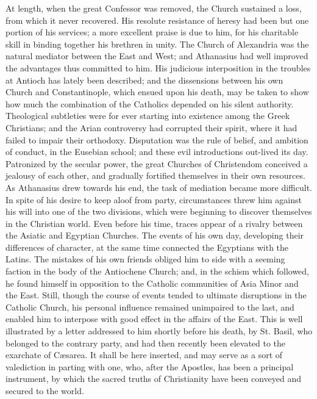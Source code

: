 At length, when the great Confessor was removed, the Church
sustained a loss, from which it never recovered. His resolute
resistance of heresy had been but one portion of his services; a more
excellent praise is due to him, for his charitable skill in binding
together his brethren in unity. The Church of Alexandria was the
natural mediator between the East and West; and Athanasius had well
improved the advantages thus committed to him. His judicious
interposition in the troubles at Antioch has lately been described;
and the dissensions between his own Church and Constantinople, which
ensued upon his death, may be taken to show how much the combination
of the Catholics depended on his silent authority. Theological
subtleties were for ever starting into existence among the Greek
Christians; and the Arian controversy had corrupted their spirit,
where it had failed to impair their orthodoxy. Disputation was
the rule of belief, and ambition of conduct, in the Eusebian school;
and these evil introductions out-lived its day. Patronized by the
secular power, the great Churches of Christendom conceived a jealousy
of each other, and gradually fortified themselves in their own
resources. As Athanasius drew towards his end, the task of mediation
became more difficult. In spite of his desire to keep aloof from
party, circumstances threw him against his will into one of the two
divisions, which were beginning to discover themselves in the
Christian world. Even before his time, traces appear of a rivalry
between the Asiatic and Egyptian Churches. The events of his own day,
developing their differences of character, at the same time connected
the Egyptians with the Latins. The mistakes of his own friends obliged
him to side with a seeming faction in the body of the Antiochene
Church; and, in the schism which followed, he found himself in
opposition to the Catholic communities of Asia Minor and the East.
Still, though the course of events tended to ultimate disruptions in
the Catholic Church, his personal influence remained unimpaired to the
last, and enabled him to interpose with good effect in the affairs of
the East. This is well illustrated by a letter addressed to him
shortly before his death, by St. Basil, who belonged to the contrary
party, and had then recently been elevated to the exarchate of
Cæsarea. It shall be here inserted, and may serve as a sort of
valediction in parting with one, who, after the Apostles, has been a
principal instrument, by which the sacred truths of Christianity have
been conveyed and secured to the world.

